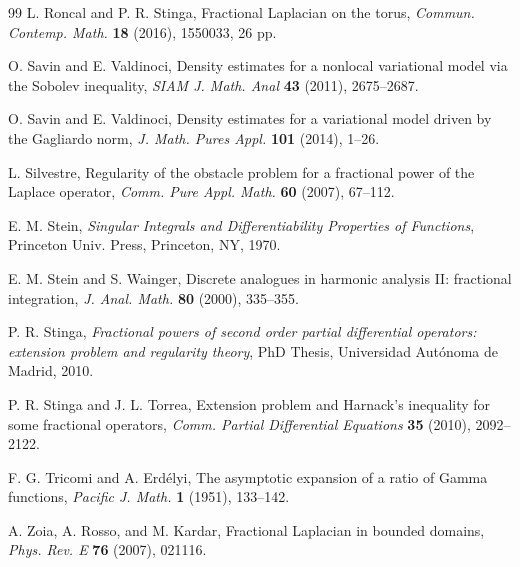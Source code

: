 \documentclass[a4paper,11pt,reqno]{amsart}
\theoremstyle{definition}
\numberwithin{equation}{section}
\begin{document}
\begin{thebibliography}{99}
L. Roncal and P. R. Stinga,
{Fractional Laplacian on the torus},
\textit{Commun. Contemp. Math.}
\textbf{18} (2016), 1550033, 26 pp.

O. Savin and E. Valdinoci,
{Density estimates for a nonlocal variational model via the Sobolev inequality},
\textit{SIAM J. Math. Anal}
\textbf{43} (2011), 2675--2687.

O. Savin and E. Valdinoci,
{Density estimates for a variational model driven by the Gagliardo norm},
\textit{J. Math. Pures Appl.}
\textbf{101} (2014), 1--26.

L. Silvestre,
{Regularity of the obstacle problem for a fractional power of the Laplace operator},
\textit{Comm. Pure Appl. Math.}
\textbf{60} (2007), 67--112.

E. M. Stein,
\textit{Singular Integrals and Differentiability Properties of Functions},
Princeton Univ. Press,
Princeton, NY, 1970.

E. M. Stein and S. Wainger,
Discrete analogues in harmonic analysis II: fractional integration,
\textit{J. Anal. Math.} \textbf{80} (2000), 335--355.

P. R. Stinga,
\textit{Fractional powers of second order partial differential operators: extension problem and regularity theory},
PhD Thesis, Universidad Aut\'onoma de Madrid, 2010.

P. R. Stinga and J. L. Torrea,
{Extension problem and Harnack's inequality for some fractional operators},
\textit{Comm. Partial Differential Equations}
\textbf{35} (2010), 2092--2122.

F. G. Tricomi and A. Erd\'elyi,
{The asymptotic expansion of a ratio of Gamma functions},
\textit{Pacific J. Math.}
\textbf{1} (1951), 133--142.

A. Zoia, A. Rosso, and M. Kardar,
{Fractional Laplacian in bounded domains},
\textit{Phys. Rev. E}
\textbf{76} (2007), 021116.

\end{thebibliography}

\end{document}
